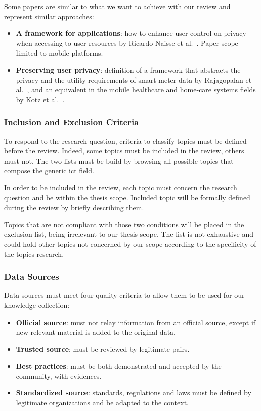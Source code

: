 Some papers are similar to what we want to achieve with our review and represent similar approaches:
\begin{itemize}
    \item \textbf{A \gls{framework} for  applications}: how to enhance user control on privacy when accessing to user resources by Ricardo Naisse et al.~\cite{NEISSE2016257}. Paper scope limited to mobile platforms.
    \item \textbf{Preserving user privacy}: definition of a \gls{framework} that abstracts the privacy and the utility requirements of smart meter data by Rajagopalan et al.~\cite{6102315}, and an equivalent in the mobile healthcare and home-care systems fields by Kotz et al.~\cite{10.1145/1655084.1655086}.
\end{itemize}

\subsubsection{Inclusion and Exclusion Criteria}
\label{subsubsec:state_methodology_approach_topic}

To respond to the research question, criteria to classify topics must be defined before the review. Indeed, some topics must be included in the review, others must not. The two lists must be build by browsing all possible topics that compose the generic \gls{ict} field.

In order to be included in the review, each topic must concern the research question and be within the thesis scope. Included topic will be formally defined during the review by briefly describing them.

Topics that are not compliant with those two conditions will be placed in the exclusion list, being irrelevant to our thesis scope. The list is not exhaustive and could hold other topics not concerned by our scope according to the specificity of the topics research.

\subsubsection{Data Sources}
\label{subsubsec:state_methodology_approach_sources}

Data sources must meet four quality criteria to allow them to be used for our knowledge collection:
\begin{itemize}
    \item \textbf{Official source}: must not relay information from an official source, except if new relevant material is added to the original data.
    \item \textbf{Trusted source}: must be reviewed by legitimate pairs.
    \item \textbf{Best practices}: must be both demonstrated and accepted by the community, with evidences. 
    \item \textbf{Standardized source}: standards, regulations and laws must be defined by legitimate organizations and be adapted to the context.
\end{itemize}

